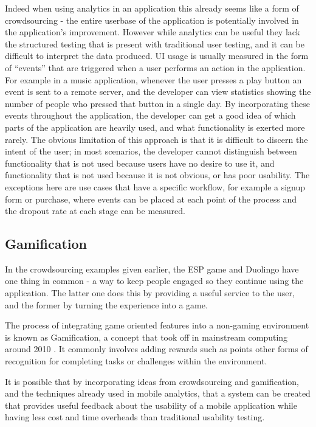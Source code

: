 Indeed when using analytics in an application this already seems like a form of crowdsourcing - the entire userbase of the application is potentially involved in the application’s improvement. However while analytics can be useful they lack the structured testing that is present with traditional user testing, and it can be difficult to interpret the data produced. UI usage is usually measured in the form of “events” that are triggered when a user performs an action in the application. For example in a music application, whenever the user presses a play button an event is sent to a remote server, and the developer can view statistics showing the number of people who pressed that button in a single day. By incorporating these events throughout the application, the developer can get a good idea of which parts of the application are heavily used, and what functionality is exerted more rarely. The obvious limitation of this approach is that it is difficult to discern the intent of the user; in most scenarios, the developer cannot distinguish between functionality that is not used because users have no desire to use it, and functionality that is not used because it is not obvious, or has poor usability. The exceptions here are use cases that have a specific workflow, for example a signup form or purchase, where events can be placed at each point of the process and the dropout rate at each stage can be measured.

\subsection{Gamification}

In the crowdsourcing examples given earlier, the ESP game and Duolingo have one thing in common - a way to keep people engaged so they continue using the application. The latter one does this by providing a useful service to the user, and the former by turning the experience into a game.

The process of integrating game oriented features into a non-gaming environment is known as Gamification, a concept that took off in mainstream computing around 2010 \cite{gamification-trends}. It commonly involves adding rewards such as points other forms of recognition for completing tasks or challenges within the environment.

It is possible that by incorporating ideas from crowdsourcing and gamification, and the techniques already used in mobile analytics, that a system can be created that provides useful feedback about the usability of a mobile application while having less cost and time overheads than traditional usability testing.

